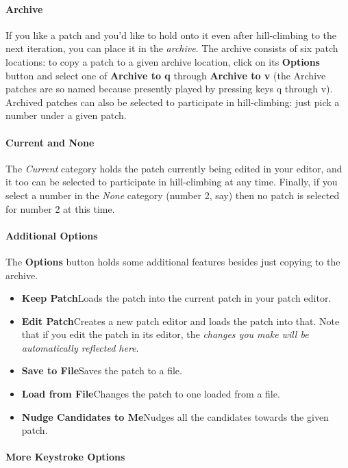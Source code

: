\documentclass{article}
\begin{document}
\paragraph{Archive} If you like a patch and you'd like to hold onto it even after hill-climbing to the next iteration, you can place it in the {\it archive}.  The archive consists of six patch locations: to copy a patch to a given archive location, click on its {\bf Options} button and select one of {\bf Archive to q} through {\bf Archive to v} (the Archive patches are so named because presently played by pressing keys q through v).  Archived patches can also be selected to participate in hill-climbing: just pick a number under a given patch.

\paragraph{Current and None} The {\it Current} category holds the patch currently being edited in your editor, and it too can be selected to participate in hill-climbing at any time.  Finally, if you select a number in the {\it None} category (number 2, say) then no patch is selected for number 2 at this time.

\paragraph{Additional Options} The {\bf Options} button holds some additional features besides just copying to the archive.  

\enlargethispage{0.5em}

\begin{itemize}
\item {\bf Keep Patch}\quad Loads the patch into the current patch in your patch editor.
\item {\bf Edit Patch}\quad Creates a new patch editor and loads the patch into that.  Note that if you edit the patch in its editor, the {\it changes you make will be automatically reflected here}.
\item {\bf Save to File}\quad Saves the patch to a file.
\item {\bf Load from File}\quad Changes the patch to one loaded from a file. 
\item {\bf Nudge Candidates to Me}\quad Nudges all the candidates towards the given patch. 
\end{itemize}

\paragraph{More Keystroke Options}
\end{document}
